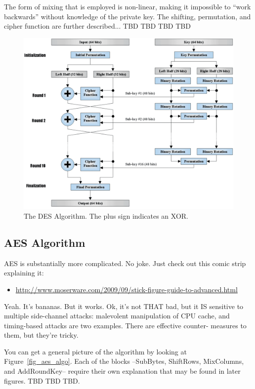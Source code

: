 \documentclass[journal,twocolumn]{IEEEtran}
\begin{document}
The form of mixing that is employed is non-linear, making it impossible to 
``work backwards'' without knowledge of the private key. The shifting, 
permutation, and cipher function are further described... TBD TBD TBD TBD

\begin{figure}
\begin{center}
\includegraphics[scale=0.4]{des_algo.png}
\caption{The DES Algorithm. The plus sign indicates an XOR.}
\label{fig_des_algo}
\end{center}
\end{figure}

\subsection{AES Algorithm}

AES is substantially more complicated. No joke. Just check out this 
comic strip explaining it:

\begin{itemize}
\item
\url{http://www.moserware.com/2009/09/stick-figure-guide-to-advanced.html}
\end{itemize}

Yeah. It's bananas. But it works. Ok, it's not THAT bad, but it IS 
sensitive to multiple side-channel attacks: malevolent manipulation of CPU
cache, and timing-based attacks are two examples. There are effective counter-
measures to them, but they're tricky.

You can get a general picture of the algorithm by looking at 
Figure~\ref{fig_aes_algo}. Each of the blocks --SubBytes, ShiftRows,
MixColumns, and AddRoundKey-- require their own explanation that may be found
in later figures. TBD TBD TBD.
\end{document}
